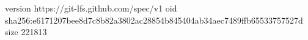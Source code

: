 version https://git-lfs.github.com/spec/v1
oid sha256:e6171207bee8d7c8b82a3802ac28854b845404ab34aec7489ffb65533757527d
size 221813
